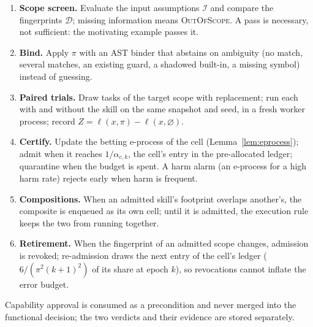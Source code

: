\begin{enumerate}
\item \textbf{Scope screen.}  Evaluate the input assumptions $\mathcal{I}$ and compare the fingerprints $\mathcal{D}$; missing
information means \textsc{OutOfScope}.  A pass is necessary, not sufficient: the motivating example passes it.
\item \textbf{Bind.}  Apply $\pi$ with an AST binder that abstains on ambiguity (no match, several matches, an existing guard, a
shadowed built-in, a missing symbol) instead of guessing.
\item \textbf{Paired trials.}  Draw tasks of the target scope with replacement; run each with and without the skill on the same
snapshot and seed, in a fresh worker process; record $Z=\ell(x,\pi)-\ell(x,\varnothing)$.
\item \textbf{Certify.}  Update the betting e-process of the cell (Lemma~\ref{lem:eprocess}); admit when it reaches $1/\alpha_{c,k}$,
the cell's entry in the pre-allocated ledger; quarantine when the budget is spent.  A harm alarm (an e-process for a high harm rate)
rejects early when harm is frequent.
\item \textbf{Compositions.}  When an admitted skill's footprint overlaps another's, the composite is enqueued as its own cell; until
it is admitted, the execution rule keeps the two from running together.
\item \textbf{Retirement.}  When the fingerprint of an admitted scope changes, admission is revoked; re-admission draws the next entry
of the cell's ledger ($6/(\pi^2(k+1)^2)$ of its share at epoch $k$), so revocations cannot inflate the error budget.
\end{enumerate}
Capability approval is consumed as a precondition and never merged into the functional decision; the two verdicts and their
evidence are stored separately.
